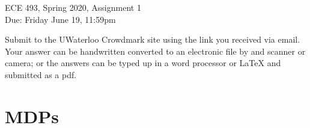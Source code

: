 \documentclass[11pt,onecolumn]{article}
\begin{document}
\begin{center}
\begin{Large}
ECE 493, Spring 2020, Assignment 1\\
Due: Friday June 19, 11:59pm
\end{Large}
\end{center}
\vspace{.2em}

\vspace{.2em}
\begin{center}
Submit to the UWaterloo Crowdmark site using the link you received via email.
Your answer can be handwritten converted to an electronic file by and scanner or camera; or the answers can be typed up in a word processor or LaTeX and submitted as a pdf.
\end{center}
\vspace{.2em}

\vspace{.2em}
\section{MDPs}
\end{document}
